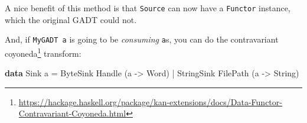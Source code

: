 \documentclass[]{article}
\newenvironment{Shaded}{}{}
\newcommand{\DataTypeTok}[1]{\textcolor[rgb]{0.56,0.13,0.00}{#1}}
\newcommand{\FunctionTok}[1]{\textcolor[rgb]{0.02,0.16,0.49}{#1}}
\newcommand{\KeywordTok}[1]{\textcolor[rgb]{0.00,0.44,0.13}{\textbf{#1}}}
\newcommand{\NormalTok}[1]{#1}
\newcommand{\OperatorTok}[1]{\textcolor[rgb]{0.40,0.40,0.40}{#1}}
\newcommand{\OtherTok}[1]{\textcolor[rgb]{0.00,0.44,0.13}{#1}}
\renewcommand{\href}[2]{#2\footnote{\url{#1}}}
\begin{document}
\begin{Shaded}
\end{Shaded}

A nice benefit of this method is that \texttt{Source} can now have a
\texttt{Functor} instance, which the original GADT could not.

And, if \texttt{MyGADT\ a} is going to be \emph{consuming} \texttt{a}s, you can
do the
\href{https://hackage.haskell.org/package/kan-extensions/docs/Data-Functor-Contravariant-Coyoneda.html}{contravariant
coyoneda} transform:

\begin{Shaded}
\begin{Highlighting}[]
\KeywordTok{data} \DataTypeTok{Sink}\NormalTok{ a }\OtherTok{=}
    \DataTypeTok{ByteSink} \DataTypeTok{Handle}\NormalTok{ (a }\OtherTok{{-}\textgreater{}} \DataTypeTok{Word}\NormalTok{)}
  \OperatorTok{|} \DataTypeTok{StringSink} \DataTypeTok{FilePath}\NormalTok{ (a }\OtherTok{{-}\textgreater{}} \DataTypeTok{String}\NormalTok{)}
\end{Highlighting}
\end{Shaded}
\end{document}
